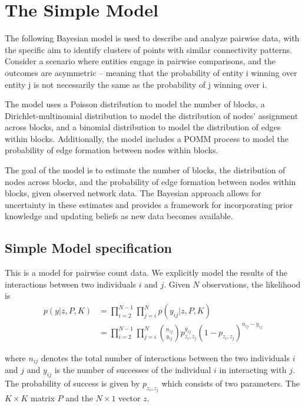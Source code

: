 \documentclass[11pt]{amsart}
\begin{document}
\newpage



\section{The Simple Model}

The following Bayesian model is used to describe and analyze pairwise data, with the specific aim to identify clusters of points with similar connectivity patterns. Consider a scenario where entities engage in pairwise comparisons, and the outcomes are asymmetric – meaning that the probability of entity i winning over entity j is not necessarily the same as the probability of j winning over i. 


The model uses a Poisson distribution to model the number of blocks, a Dirichlet-multinomial distribution to model the distribution of nodes' assignment across blocks, and a binomial distribution to model the distribution of edges within blocks. Additionally, the model includes a POMM process to model the probability of edge formation between nodes within blocks.

The goal of the model is to estimate the number of blocks, the distribution of nodes across blocks, and the probability of edge formation between nodes within blocks, given observed network data. The Bayesian approach allows for uncertainty in these estimates and provides a framework for incorporating prior knowledge and updating beliefs as new data becomes available.

\subsection{Simple Model specification}
This is a model for pairwise count data. We explicitly model the results of the interactions between two individuals $i$ and $j$. Given $N$ observations, the likelihood is 
\begin{align}
p(y| z, P, K) &= \prod_{i =2 }^{N-1} \prod_{j =i}^{N} p(y_{ij} | z, P, K) \\ 
&= \prod_{i =2 }^{N-1} \prod_{j =i}^{N}  {n_{ij} \choose y_{ij}} p_{z_i, z_j}^{y_{ij}}(1- p_{z_i, z_j})^{n_{ij}-y_{ij}}
\end{align}

where $n_{ij}$ denotes the total number of interactions between the two individuals $i$ and $j$ and $y_{ij}$ is the number of successes of the individual $i$ in interacting with $j$. The probability of success is given by $p_{z_i, z_j}$ which consists of two parameters. The $K\times K$ matrix $P$ and the $N \times 1$ vector $z$.
\end{document}

